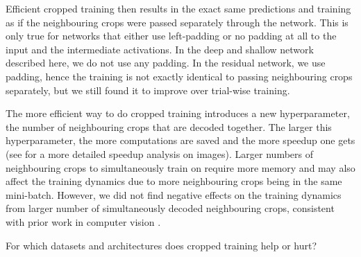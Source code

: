     Efficient cropped training then results in the exact same predictions
and training as if the neighbouring crops were passed separately through
the network. This is only true for networks that either use left-padding
or no padding at all to the input and the intermediate activations. In
the deep and shallow network described here, we do not use any padding.
In the residual network, we use padding, hence the training is not
exactly identical to passing neighbouring crops separately, but we still
found it to improve over trial-wise training.

    The more efficient way to do cropped training introduces a new
hyperparameter, the number of neighbouring crops that are decoded
together. The larger this hyperparameter, the more computations are
saved and the more speedup one gets (see
\citet{giusti_fast_2013} for a more detailed speedup analysis
on images). Larger numbers of neighbouring crops to simultaneously train
on require more memory and may also affect the training dynamics due to
more neighbouring crops being in the same mini-batch. However, we did
not find negative effects on the training dynamics from larger number of
simultaneously decoded neighbouring crops, consistent with prior work in
computer vision \citep{shelhamer_fully_2016}.

\begin{openbox}
\item For which datasets and architectures does cropped training help or hurt? 
\end{openbox}
